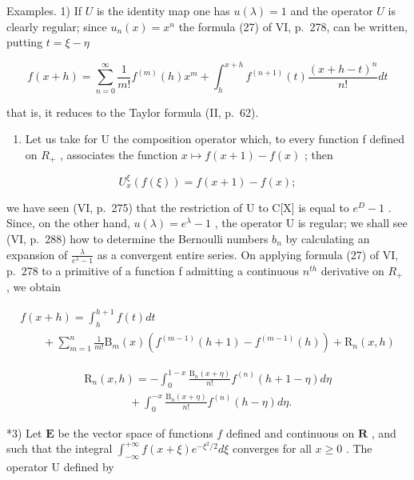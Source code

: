 Examples. 1) If \(U\) is the identity map one has \(u(\lambda) = 1\) and the operator \(U\) is clearly regular; since \(u_{n}(x) = x^{n}\) the formula (27) of VI, p.~278, can be written, putting \(t = \xi - \eta\)

\[
f (x + h) = \sum_ {n = 0} ^ {\infty} \frac {1}{m !} f ^ {(m)} (h) x ^ {m} + \int_ {h} ^ {x + h} f ^ {(n + 1)} (t) \frac {(x + h - t) ^ {n}}{n !} d t
\]

that is, it reduces to the Taylor formula (II, p.~62).

\begin{enumerate}
\def\labelenumi{\arabic{enumi})}
\setcounter{enumi}{1}
\tightlist
\item
  Let us take for U the composition operator which, to every function f defined on \(R_{+}\) , associates the function \(x \mapsto f(x + 1) - f(x)\) ; then
\end{enumerate}

\[
U _ {x} ^ {\xi} (f (\xi)) = f (x + 1) - f (x);
\]

we have seen (VI, p.~275) that the restriction of U to C{[}X{]} is equal to \(e^{D}-1\) . Since, on the other hand, \(u(\lambda)=e^{\lambda}-1\) , the operator U is regular; we shall see (VI, p.~288) how to determine the Bernoulli numbers \(b_{n}\) by calculating an expansion of \(\frac{\lambda}{e^{\lambda}-1}\) as a convergent entire series. On applying formula (27) of VI, p.~278 to a primitive of a function f admitting a continuous \(n^{th}\) derivative on \(R_{+}\) , we obtain

\[
\begin{array}{l} f (x + h) = \int_ {h} ^ {h + 1} f (t) d t \\ \qquad + \sum_ {m = 1} ^ {n} \frac {1}{m !} \mathrm{B} _ {m} (x) \left(f ^ {(m - 1)} (h + 1) - f ^ {(m - 1)} (h)\right) + \mathrm{R} _ {n} (x, h) \end{array}\tag{35}
\]

\[
\begin{array}{l} \mathrm{R} _ {n} (x, h) = - \int_ {0} ^ {1 - x} \frac {\mathrm{B} _ {n} (x + \eta)}{n !} f ^ {(n)} (h + 1 - \eta) d \eta \\ \qquad \qquad + \int_ {0} ^ {- x} \frac {\mathrm{B} _ {n} (x + \eta)}{n !} f ^ {(n)} (h - \eta) d \eta . \end{array}\tag{36}
\]

*3) Let \(\mathbf{E}\) be the vector space of functions \(f\) defined and continuous on \(\mathbf{R}\) , and such that the integral \(\int_{-\infty}^{+\infty} f(x + \xi)e^{-\xi^2 / 2}d\xi\) converges for all \(x \geqslant 0\) . The operator \(\mathrm{U}\) defined by

